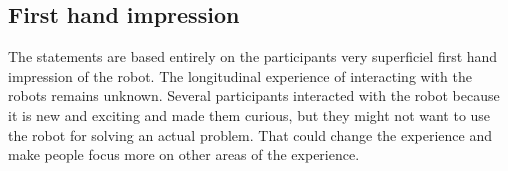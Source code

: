 \subsection{First hand impression}
The statements are based entirely on the participants very superficiel first hand impression of the robot. The longitudinal experience of interacting with the robots remains unknown. Several participants interacted with the robot because it is new and exciting and made them curious, but they might not want to use the robot for solving an actual problem. That could change the experience and make people focus more on other areas of the experience.